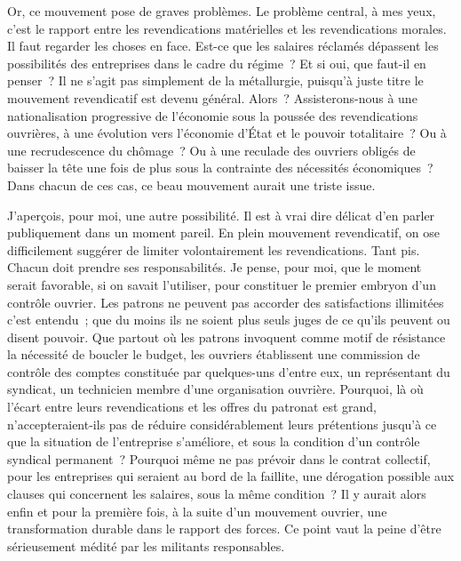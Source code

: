 \documentclass[french,twoside]{book} %
\begin{document}
Or, ce mouvement pose de graves problèmes. Le problème central, à mes yeux, c'est le rapport entre les revendications matérielles et les revendications morales. Il faut regarder les choses en face. Est-ce que les salaires réclamés dépassent les possibilités des entreprises dans le cadre du régime ? Et si oui, que faut-il en penser ? Il ne s'agit pas simplement de la métallurgie, puisqu'à juste titre le mouvement revendicatif est devenu général. Alors ? Assisterons-nous à une nationalisation progressive de l'économie sous la poussée des revendications ouvrières, à une évolution vers l'économie d'État et le pouvoir totalitaire ? Ou à une recrudescence du chômage ? Ou à une reculade des ouvriers obligés de baisser la tête une fois de plus sous la contrainte des nécessités économiques ? Dans chacun de ces cas, ce beau mouvement aurait une triste issue.\par
J'aperçois, pour moi, une autre possibilité. Il est à vrai dire délicat d'en parler publiquement dans un moment pareil. En plein mouvement revendicatif, on ose difficilement suggérer de limiter volontairement les revendications. Tant pis. Chacun doit prendre ses responsabilités. Je pense, pour moi, que le moment serait favorable, si on savait l'utiliser, pour constituer le premier embryon d'un contrôle ouvrier. Les patrons ne peuvent pas accorder des satisfactions illimitées c'est entendu ; que du moins ils ne soient plus seuls juges de ce qu'ils peuvent ou disent pouvoir. Que partout où les patrons invoquent comme motif de résistance la nécessité de boucler le budget, les ouvriers établissent une commission de contrôle des comptes constituée par quelques-uns d'entre eux, un représentant du syndicat, un technicien membre d'une organisation ouvrière. Pourquoi, là où l'écart entre leurs revendications et les offres du patronat est grand, n'accepteraient-ils pas de réduire considérablement leurs prétentions jusqu'à ce que la situation de l'entreprise s'améliore, et sous la condition d'un contrôle syndical permanent ? Pourquoi même ne pas prévoir dans le contrat collectif, pour les entreprises qui seraient au bord de la faillite, une dérogation possible aux clauses qui concernent les salaires, sous la même condition ? Il y aurait alors enfin et pour la première fois, à la suite d'un mouvement ouvrier, une transformation durable dans le rapport des forces. Ce point vaut la peine d'être sérieusement médité par les militants responsables.\par
\end{document}
